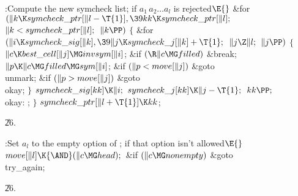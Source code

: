 \B{}:Compute the new symcheck list;  if $a_1%
\,a_2\ldots a_l$ is rejected\X${}\E{}$\6
\&{for} ${}(\|k\K\\{symcheck\_ptr}[\|l-\T{1}],\39\\{kk}\K\\{symcheck\_ptr}[%
\|l];{}$ ${}\|k<\\{symcheck\_ptr}[\|l];{}$ ${}\|k\PP){}$\5
${}\{{}$\1\6
\&{for} ${}(\|i\K\\{symcheck\_sig}[\|k],\39\|j\K\\{symcheck\_j}[\|k]+\T{1};{}$
${}\|j\Z\|l;{}$ ${}\|j\PP){}$\5
${}\{{}$\1\6
${}\|c\K\\{best\_cell}[\|j]\MG\\{invsym}[\|i]{}$;\6
\&{if} ${}(\R\|c\MG\\{filled}){}$\1\5
\&{break};\2\6
${}\|p\K\|c\MG\\{filled}\MG\\{sym}[\|i]{}$;\6
\&{if} ${}(\|p<\\{move}[\|j]){}$\1\5
\&{goto} \\{unmark};\2\6
\&{if} ${}(\|p>\\{move}[\|j]){}$\1\5
\&{goto} \\{okay};\2\6
\4${}\}{}$\2\6
${}\\{symcheck\_sig}[\\{kk}]\K\|i;{}$\6
${}\\{symcheck\_j}[\\{kk}]\K\|j-\T{1};{}$\6
${}\\{kk}\PP;{}$\6
\4\\{okay}:\5
;\6
\4${}\}{}$\2\6
${}\\{symcheck\_ptr}[\|l+\T{1}]\K\\{kk}{}$;\par
\U26.\fi

\B{}:Set $a_l$ to the empty option of ;  if that option isn't allowed\X${}\E{}$\6
$\\{move}[\|l]\K{\AND}(\|c\MG\\{head});{}$\6
\&{if} ${}(\|c\MG\\{nonempty}){}$\1\5
\&{goto} \\{try\_again};\2\par
\U26.\fi

